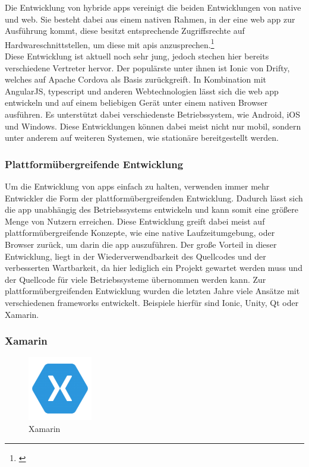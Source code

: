 Die Entwicklung von hybride \glspl{app} vereinigt die beiden Entwicklungen von native und web. Sie besteht dabei aus einem nativen Rahmen, in der eine web \gls{app} zur Ausführung kommt, diese besitzt entsprechende Zugriffsrechte auf Hardwareschnittstellen, um diese mit \glspl{api} anzusprechen.\footnote{\citep[vgl.][Native App, Web App und Hybrid App im Überblick]{PetraRiepe.NativeApp}\label{note2}}\\
Diese Entwicklung ist aktuell noch sehr jung, jedoch stechen hier bereits verschiedene Vertreter hervor. Der populärste unter ihnen ist Ionic von Drifty, welches auf Apache Cordova als Basis zurückgreift. In Kombination mit AngularJS, \gls{typescript} und anderen Webtechnologien lässt sich die web \gls{app} entwickeln und auf einem beliebigen Gerät unter einem nativen Browser ausführen. Es unterstützt dabei verschiedenste Betriebssystem, wie Android, iOS und Windows. Diese Entwicklungen können dabei meist nicht nur mobil, sondern unter anderem auf weiteren Systemen, wie stationäre bereitgestellt werden.

\subsubsection{Plattformübergreifende Entwicklung}

Um die Entwicklung von \glspl{app} einfach zu halten, verwenden immer mehr Entwickler die Form der plattformübergreifenden Entwicklung. Dadurch lässt sich die \gls{app} unabhängig des Betriebssystems entwickeln und kann somit eine größere Menge von Nutzern erreichen. Diese Entwicklung greift dabei meist auf plattformübergreifende Konzepte, wie eine native Laufzeitumgebung, oder Browser zurück, um darin die \gls{app} auszuführen. Der große Vorteil in dieser Entwicklung, liegt in der Wiederverwendbarkeit des Quellcodes und der verbesserten Wartbarkeit, da hier lediglich ein Projekt gewartet werden muss und der Quellcode für viele Betriebssysteme übernommen werden kann. Zur plattformübergreifenden Entwicklung wurden die letzten Jahre viele Ansätze mit verschiedenen \glspl{framework} entwickelt. Beispiele hierfür sind Ionic, Unity, Qt oder Xamarin.\\
\newpage

\subsubsection{Xamarin}

\begin{figure}
	\begin{center}
		\includegraphics[width=0.25\textwidth]{images/technische_grundlagen/xamarin.png}
	\end{center}
	\caption{Xamarin}
	\label{fig:xamarin}
\end{figure}

